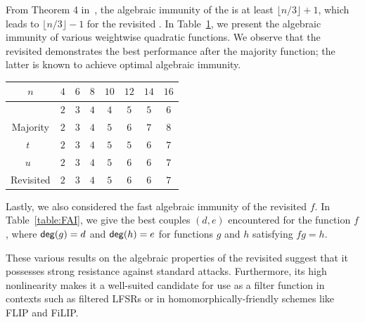 \documentclass{llncs}
\begin{document}
From Theorem 4 in~\cite{DAM:WCST14}, the algebraic immunity of the \hwbf{} is at least $\lfloor n/3\rfloor +1$, which leads to $\lfloor n/3\rfloor -1$ for the revisited \hwbf{}.
In Table~\ref{table:comparisonsAI}, we present the algebraic immunity of various weightwise quadratic functions. We observe that the revisited \hwbf{} demonstrates the best performance after the majority function; the latter is known to achieve optimal algebraic immunity.

\begin{table}[ht]
	\small
	\centering
	\begin{tabular}{|c| c|c|c|c| c|c|c|}
		\hline
		$n$ & $4$  & $6$  & $8$  &  $10$ & $12$ & $14$ & $16$  \\
		\hline	
		\hwbf{}   & $2$  & $3$  & $4$  &  $4$ & $5$ & $5$ & $6$  \\  	
		Majority   & $2$  & $3$  & $4$  &  $5$ & $6$ & $7$ & $8$  \\
		$t$~\cite{DAM:MeaOza24}   & $2$  & $3$  & $4$  &  $5$ & $5$ & $6$ & $7$\\
		$u$~\cite{DAM:MeaOza24}   & $2$  & $3$  & $4$  &  $5$ & $6$ & $6$ & $7$ \\					
		Revisited \hwbf{}   & $2$  & $3$  & $4$  &  $5$ & $6$ & $6$ & $7$\\
		\hline
	\end{tabular}
	\label{table:comparisonsAI}
\end{table}

Lastly, we also considered the fast algebraic immunity of the revisited \hwbf{} $f$. In Table~\ref{table:FAI}, we give the best couples $(d,e)$ encountered for the function $f$, where $\mathsf{deg}(g)=d$ and $\mathsf{deg}(h)=e$ for functions $g$ and $h$ satisfying $fg=h$.

\bigskip

These various results on the algebraic properties of the revisited \hwbf{} suggest that it possesses strong resistance against standard attacks. Furthermore, its high nonlinearity makes it a well-suited candidate for use as a filter function in contexts such as filtered \textsf{LFSR}s or in homomorphically-friendly schemes like \textsf{FLIP} and \textsf{FiLIP}.
\end{document}
